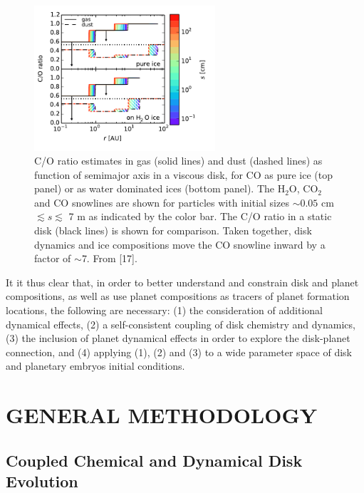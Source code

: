 \documentclass[12pt, letterpaper]{article}
\begin{document}
\begin{figure}[h!]
\centering
\includegraphics[width=0.6\textwidth]{C_O_water_ice.pdf}
\caption{C/O ratio estimates in gas (solid lines) and dust (dashed lines) as function of semimajor axis in a viscous disk, for CO as pure ice (top panel) or as water dominated ices (bottom panel). The H$_2$O, CO$_2$ and CO snowlines are shown for particles with initial sizes $\sim0.05$ cm $\lesssim s \lesssim$ 7 m as indicated by the color bar. The C/O ratio in a static disk (black lines) is shown for comparison. Taken together, disk dynamics and ice compositions move the CO snowline inward by a factor of $\sim$7. From [17].} 
\label{fig:CO_ratio}
\end{figure}

It it thus clear that, in order to better understand and constrain disk and planet compositions, as well as use planet compositions as tracers of planet formation locations, the following are necessary: (1) the consideration of additional dynamical effects, (2) a self-consistent coupling of disk chemistry and dynamics, (3) the inclusion of planet dynamical effects in order to explore the disk-planet connection, and (4) applying (1), (2) and (3) to a wide parameter space of disk and planetary embryos initial conditions.   


\section{GENERAL METHODOLOGY}


\subsection{Coupled Chemical and Dynamical Disk Evolution} 
\end{document}
